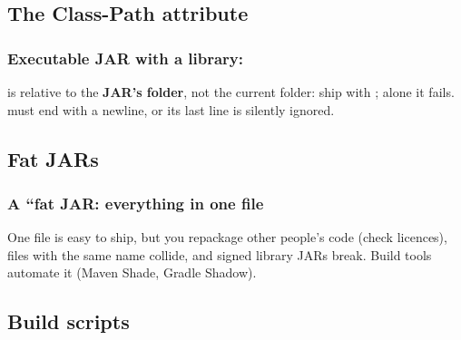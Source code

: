 \documentclass[aspectratio=169,10pt,compress]{beamer}
\begin{document}

\subsection[Class-Path]{The Class-Path attribute}




\begin{frame}[t,fragile] \frametitle{Executable JAR with a library: }

  \vspace{0.1em}
  \small
   is relative to the \textbf{JAR's folder}, not the current folder: ship  with ;
  alone it fails.  must end with a newline, or its last line is silently ignored.
\end{frame}

\subsection[Fat JAR]{Fat JARs}




\begin{frame}[t,fragile] \frametitle{A ``fat JAR: everything in one file}

  \vspace{0.1em}
  \small
  One file is easy to ship, but you repackage other people's code (check licences), files with the same name collide,
  and signed library JARs break. Build tools automate it (Maven Shade, Gradle Shadow).
\end{frame}

\subsection[Scripts]{Build scripts}
\end{document}
